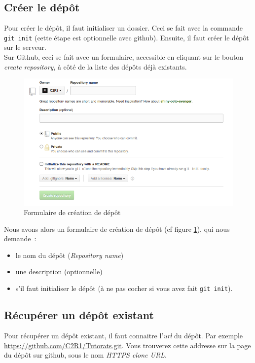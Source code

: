 \documentclass[a4paper,10pt]{report}
\begin{document}
    \subsection{Cr\'eer le d\'ep\^ot}
Pour cr\'eer le d\'ep\^ot, il faut initialiser un dossier. Ceci se fait avec la commande \verb|git init| (cette \'etape est optionnelle avec github). Ensuite, il faut cr\'eer le d\'ep\^ot sur le serveur.\\
Sur Github, ceci se fait avec un formulaire, accessible en cliquant sur le bouton \emph{create repository}, \`a c\^ot\'e de la liste des d\'ep\^ots d\'ej\`a existants.\\
\begin{figure}[h!]
  \begin{center}
    \includegraphics[scale=0.3]{images/createRepoForm}
    \caption{Formulaire de cr\'eation de d\'ep\^ot}
    \label{creationRepo}
  \end{center}
\end{figure}

Nous avons alors un formulaire de cr\'eation de d\'ep\^ot (cf figure \ref{creationRepo}), qui nous demande~:
\begin{itemize}
 \item le nom du d\'ep\^ot (\emph{Repository name})
 \item une description (optionnelle)
 \item s'il faut initialiser le d\'ep\^ot (\`a ne pas cocher si vous avez fait \verb|git init|).
\end{itemize}

    \subsection{R\'ecup\'erer un d\'ep\^ot existant}
Pour r\'ecup\'erer un d\'ep\^ot existant, il faut connaitre l'\emph{url} du d\'ep\^ot. Par exemple \url{https://github.com/C2R1/Tutorats.git}. Vous trouverez cette addresse sur la page du d\'ep\^ot sur github, sous le nom \emph{HTTPS clone URL}.\\
\end{document}
